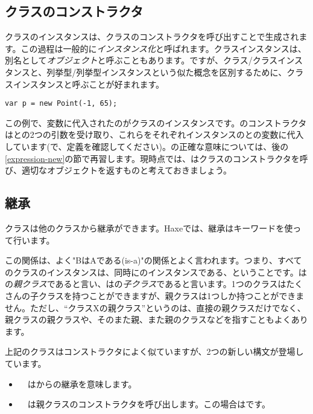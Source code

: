 \subsection{クラスのコンストラクタ}
\label{types-class-constructor}

クラスのインスタンスは、クラスのコンストラクタを呼び出すことで生成されます。この過程は一般的に\emph{インスタンス化}と呼ばれます。クラスインスタンスは、別名として\emph{オブジェクト}と呼ぶこともあります。ですが、クラス/クラスインスタンスと、列挙型/列挙型インスタンスという似た概念を区別するために、クラスインスタンスと呼ぶことが好まれます。

\begin{lstlisting}
var p = new Point(-1, 65);
\end{lstlisting}

この例で、変数に代入されたのがクラスのインスタンスです。のコンストラクタはとの2つの引数を受け取り、これらをそれぞれインスタンスのとの変数に代入しています(で、定義を確認してください)。の正確な意味については、後の\ref{expression-new}の節で再習します。現時点では、はクラスのコンストラクタを呼び、適切なオブジェクトを返すものと考えておきましょう。


\subsection{継承}
\label{types-class-inheritance}

クラスは他のクラスから継承ができます。Haxeでは、継承はキーワードを使って行います。


この関係は、よく"BはAである(is-a)"の関係とよく言われます。つまり、すべてのクラスのインスタンスは、同時にのインスタンスである、ということです。はの\emph{親クラス}であると言い、はの\emph{子クラス}であると言います。1つのクラスはたくさんの子クラスを持つことができますが、親クラスは1つしか持つことができません。ただし、``クラスXの親クラス''というのは、直接の親クラスだけでなく、親クラスの親クラスや、そのまた親、また親のクラスなどを指すこともよくあります。

上記のクラスはコンストラクタによく似ていますが、2つの新しい構文が登場しています。

\begin{itemize}
	\item {}　はからの継承を意味します。
	\item {}　は親クラスのコンストラクタを呼び出します。この場合はです。
\end{itemize}

